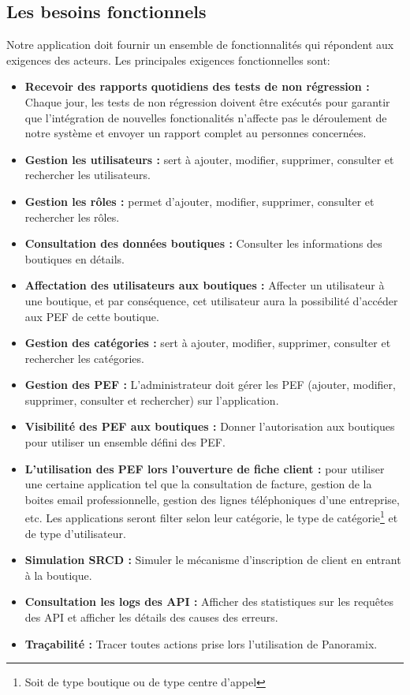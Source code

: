 \subsection[Les besoins fonctionnels]{Les besoins fonctionnels}
Notre application doit fournir un ensemble de fonctionnalités qui répondent aux exigences des acteurs. Les principales exigences fonctionnelles sont:
\begin{itemize}
	\item \textbf{Recevoir des rapports quotidiens des tests de non régression :} Chaque jour, les tests de non régression doivent être exécutés pour garantir que l'intégration de nouvelles fonctionalités n'affecte pas le déroulement de notre système et envoyer un rapport complet au personnes concernées.
	\item \textbf{Gestion les utilisateurs :} sert à ajouter, modifier, supprimer, consulter et rechercher les utilisateurs.
	\item \textbf{Gestion les rôles :}  permet d'ajouter, modifier, supprimer, consulter et rechercher les rôles.
	\item \textbf{Consultation des données boutiques :} Consulter les informations des boutiques en détails.
	\item \textbf{Affectation des utilisateurs aux boutiques :} Affecter un utilisateur à une boutique, et par conséquence, cet utilisateur aura la possibilité d'accéder aux PEF de cette boutique. 
	\item \textbf{Gestion des catégories :} sert à ajouter, modifier, supprimer, consulter et rechercher les catégories.
	\item \textbf{Gestion des PEF :} L'administrateur doit gérer les PEF (ajouter, modifier, supprimer, consulter et rechercher) sur l'application.
	\item \textbf{Visibilité des PEF aux boutiques :} Donner l'autorisation aux boutiques pour utiliser un ensemble défini des PEF.
	\item \textbf{L’utilisation des PEF lors l’ouverture de fiche client :} pour utiliser une certaine application tel que la consultation de facture, gestion de la boites email professionnelle, gestion des lignes téléphoniques d’une entreprise, etc. Les applications seront filter selon leur catégorie, le type de catégorie\footnote{Soit de type boutique ou de type centre d'appel} et de type d'utilisateur.
	\item \textbf{Simulation SRCD :} Simuler le mécanisme d'inscription de client en entrant à la boutique.
	\item \textbf{Consultation les logs des API :} Afficher des statistiques sur les requêtes des API et afficher les détails des causes des erreurs.
	\item \textbf{Traçabilité :} Tracer toutes actions prise lors l'utilisation de Panoramix.
\end{itemize}
